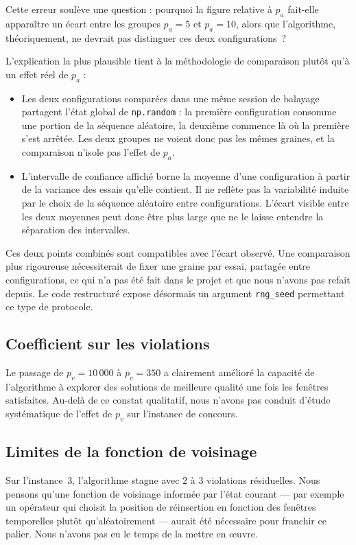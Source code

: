 \documentclass[11pt,a4paper]{article}
\begin{document}
Cette erreur soulève une question : pourquoi la figure relative à $p_a$ fait-elle
apparaître un écart entre les groupes $p_a = 5$ et $p_a = 10$, alors que l'algorithme,
théoriquement, ne devrait pas distinguer ces deux configurations~?

L'explication la plus plausible tient à la méthodologie de comparaison plutôt qu'à un
effet réel de $p_a$ :
\begin{itemize}
  \item Les deux configurations comparées dans une même session de balayage partagent
    l'état global de \texttt{np.random} : la première configuration consomme une
    portion de la séquence aléatoire, la deuxième commence là où la première s'est
    arrêtée. Les deux groupes ne voient donc pas les mêmes graines, et la comparaison
    n'isole pas l'effet de $p_a$.
  \item L'intervalle de confiance affiché borne la moyenne d'une configuration à
    partir de la variance des essais qu'elle contient. Il ne reflète pas la
    variabilité induite par le choix de la séquence aléatoire entre configurations.
    L'écart visible entre les deux moyennes peut donc être plus large que ne le
    laisse entendre la séparation des intervalles.
\end{itemize}

Ces deux points combinés sont compatibles avec l'écart observé. Une comparaison plus
rigoureuse nécessiterait de fixer une graine par essai, partagée entre configurations,
ce qui n'a pas été fait dans le projet et que nous n'avons pas refait depuis. Le code
restructuré expose désormais un argument \texttt{rng\_seed} permettant ce type de
protocole.

\subsection{Coefficient sur les violations}

Le passage de $p_v = 10\,000$ à $p_v = 350$ a clairement amélioré la capacité de
l'algorithme à explorer des solutions de meilleure qualité une fois les fenêtres
satisfaites. Au-delà de ce constat qualitatif, nous n'avons pas conduit d'étude
systématique de l'effet de $p_v$ sur l'instance de concours.

\subsection{Limites de la fonction de voisinage}

Sur l'instance~3, l'algorithme stagne avec $2$ à $3$ violations résiduelles. Nous
pensons qu'une fonction de voisinage informée par l'état courant — par exemple un
opérateur qui choisit la position de réinsertion en fonction des fenêtres temporelles
plutôt qu'aléatoirement — aurait été nécessaire pour franchir ce palier. Nous n'avons
pas eu le temps de la mettre en œuvre.
\end{document}
